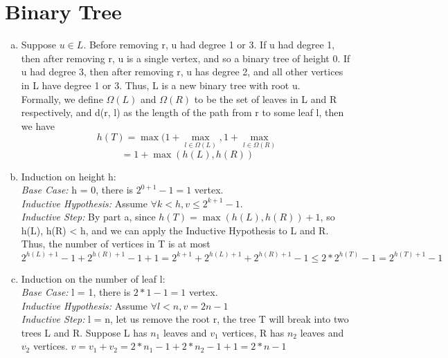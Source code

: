 \documentclass{article}
\begin{document}
\part*{Binary Tree}
\begin{enumerate}[(a).]
    \item Suppose $u \in L$. Before removing r, u had degree 1 or 3. 
    If u had degree 1, then after removing r, u is a single vertex, and so a binary tree of height 0. 
    If u had degree 3, then after removing r, u has degree 2, and all other vertices in L have degree 1 or 3. 
    Thus, L is a new binary tree with root u. 
    \\
    Formally, we define $\Omega(L)$ and $\Omega(R)$ to be the set of leaves in L and R respectively, 
    and d(r, l) as the length of the path from r to some leaf l, then we have 
    \[h(T) = \max(1 + \mathop{\max(d(u,l))}\limits_{l \in \Omega(L)}, 1 + \mathop{\max(d(v,l))}\limits_{l \in \Omega(R)} \]
    \[ = 1 + \max(h(L),h(R)) \]

    \item Induction on height h:\\
    \emph{Base Case: }h = 0, there is $2^{0+1} - 1 = 1$ vertex.\\
    \emph{Inductive Hypothesis: }Assume $\forall k < h, v \le 2^{k+1} - 1$.\\
    \emph{Inductive Step: }By part a, since $h(T) = \max(h(L),h(R)) + 1$, 
    so h(L), h(R) < h, and we can apply the Inductive Hypothesis to L and R. 
    Thus, the number of vertices in T is at most $2^{h(L)+1} - 1 + 2^{h(R)+1} - 1 + 1 = 
    2^{k+1} + 2^{h(L)+1} + 2^{h(R)+1} - 1 \le 2*2^{h(T)} - 1 = 2^{h(T)+1} - 1$

    \item Induction on the number of leaf l:\\
    \emph{Base Case: }l = 1, there is $2*1 - 1 = 1$ vertex.\\
    \emph{Inductive Hypothesis: }Assume $\forall l < n, v = 2n - 1$\\
    \emph{Inductive Step: } l = n, let us remove the root r, the tree T will break into two trees L and R. 
    Suppose L has $n_1$ leaves and $v_1$ vertices, R has $n_2$ leaves and $v_2$ vertices. 
    $v = v_1 + v_2 = 2*n_1 - 1 + 2*n_2 - 1 + 1 = 2*n - 1$


\end{enumerate}
\end{document}
